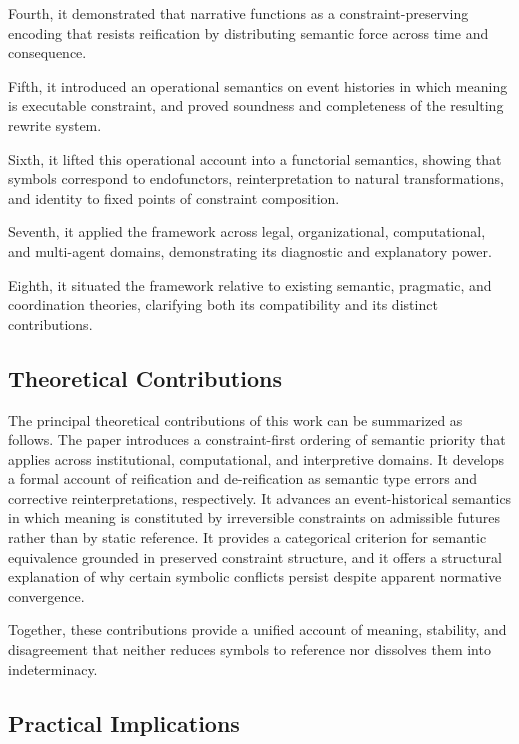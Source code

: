 \documentclass[11pt]{article}
\begin{document}
Fourth, it demonstrated that narrative functions as a constraint-preserving
encoding that resists reification by distributing semantic force across time and
consequence.

Fifth, it introduced an operational semantics on event histories in which meaning
is executable constraint, and proved soundness and completeness of the resulting
rewrite system.

Sixth, it lifted this operational account into a functorial semantics, showing
that symbols correspond to endofunctors, reinterpretation to natural
transformations, and identity to fixed points of constraint composition.

Seventh, it applied the framework across legal, organizational, computational,
and multi-agent domains, demonstrating its diagnostic and explanatory power.

Eighth, it situated the framework relative to existing semantic, pragmatic, and
coordination theories, clarifying both its compatibility and its distinct
contributions.

\subsection{Theoretical Contributions}

The principal theoretical contributions of this work can be summarized as
follows. The paper introduces a constraint-first ordering of semantic priority
that applies across institutional, computational, and interpretive domains. It
develops a formal account of reification and de-reification as semantic type
errors and corrective reinterpretations, respectively. It advances an
event-historical semantics in which meaning is constituted by irreversible
constraints on admissible futures rather than by static reference. It provides a
categorical criterion for semantic equivalence grounded in preserved constraint
structure, and it offers a structural explanation of why certain symbolic
conflicts persist despite apparent normative convergence.


Together, these contributions provide a unified account of meaning, stability,
and disagreement that neither reduces symbols to reference nor dissolves them
into indeterminacy.

\subsection{Practical Implications}
\end{document}
